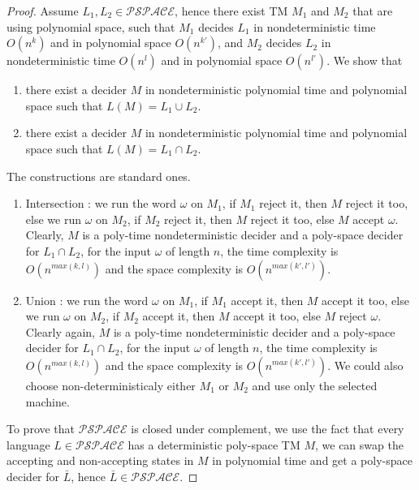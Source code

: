 \documentclass[a4paper,11pt]{report}
\begin{document}
\begin{proof}
  Assume $L_1,L_2 \in \mathcal{PSPACE}$, hence there exist TM $M_1$ and $M_2$
  that are using polynomial space, such that $M_1$ decides $L_1$ in
  nondeterministic time $O(n^k)$ and in polynomial space $O(n^{k'})$, and $M_2$
  decides $L_2$ in nondeterministic time $O(n^l)$ and in polynomial space
  $O(n^{l'})$. We show that
  \begin{enumerate}
  \item there exist a decider $M$ in nondeterministic polynomial time and
    polynomial space such that $L(M) = L_1 \cup L_2$.
  \item there exist a decider $M$ in nondeterministic polynomial time and
    polynomial space such that $L(M) = L_1 \cap L_2$.
  \end{enumerate}

  The constructions are standard ones.

  \begin{enumerate}
  \item Intersection : we run the word $\omega$ on $M_1$, if $M_1$ reject it,
    then $M$ reject it too, else we run $\omega$ on $M_2$, if $M_2$ reject it,
    then $M$ reject it too, else $M$ accept $\omega$. Clearly, $M$ is a
    poly-time nondeterministic decider and a poly-space decider for $L_1 \cap
    L_2$, for the input $\omega$ of length $n$, the time complexity is
    $O(n^{max(k,l)})$ and the space complexity is $O(n^{max(k',l')})$.

  \item Union : we run the word $\omega$ on $M_1$, if $M_1$ accept it, then $M$
    accept it too, else we run $\omega$ on $M_2$, if $M_2$ accept it, then $M$
    accept it too, else $M$ reject $\omega$. Clearly again, $M$ is a
    poly-time nondeterministic decider and a poly-space decider for $L_1 \cap
    L_2$, for the input $\omega$ of length $n$, the time complexity is
    $O(n^{max(k,l)})$ and the space complexity is $O(n^{max(k',l')})$. We could
    also choose non-deterministicaly either $M_1$ or $M_2$ and use only the
    selected machine.
  \end{enumerate}

  To prove that $\mathcal{PSPACE}$ is closed under complement, we use the fact
  that every language $L \in \mathcal{PSPACE}$ has a deterministic poly-space TM
  $M$, we can swap the accepting and non-accepting states in $M$ in polynomial
  time and get a poly-space decider for $\bar{L}$, hence
  $\bar{L}\in\mathcal{PSPACE}$.
\end{proof}
\end{document}
